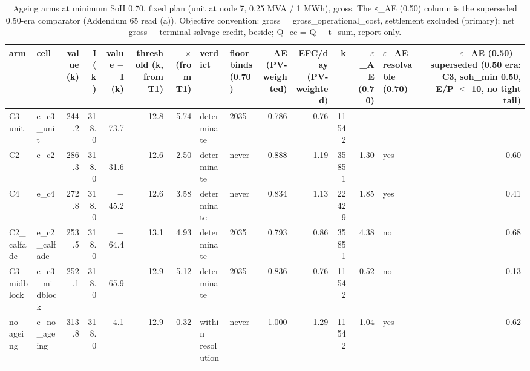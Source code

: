 \begin{table}[htbp]
\centering
\scriptsize
\caption{Ageing arms at minimum SoH 0.70, fixed plan (unit at node 7, 0.25 MVA / 1 MWh), gross. The $\varepsilon$\_AE (0.50) column is the superseded 0.50-era comparator (Addendum 65 read (a)). Objective convention: gross = gross\_operational\_cost, settlement excluded (primary); net = gross $-$ terminal salvage credit, beside; Q\_cc = Q + t\_sum, report-only.}
\label{tab:T8}
\begin{tabular}{llrrrrrllrrrrlr}
\toprule
arm & cell & value (k\texteuro{}) & I (k\texteuro{}) & value $-$ I (k\texteuro{}) & threshold (k\texteuro{}, from T1) & $\times$ (from T1) & verdict & floor binds (0.70) & AE (PV-weighted) & EFC/day (PV-weighted) & k & $\varepsilon$\_AE (0.70) & $\varepsilon$\_AE resolvable (0.70) & $\varepsilon$\_AE (0.50) -- superseded (0.50 era: C3, soh\_min 0.50, E/P $\leq$ 10, no tight tail) \\
\midrule
C3\_unit & e\_c3\_unit & 244.2 & 318.0 & $-$73.7 & 12.8 & 5.74 & determinate & 2035 & 0.786 & 0.76 & 11542 & --- & --- & --- \\
C2 & e\_c2 & 286.3 & 318.0 & $-$31.6 & 12.6 & 2.50 & determinate & never & 0.888 & 1.19 & 35851 & 1.30 & yes & 0.60 \\
C4 & e\_c4 & 272.8 & 318.0 & $-$45.2 & 12.6 & 3.58 & determinate & never & 0.834 & 1.13 & 22429 & 1.85 & yes & 0.41 \\
C2\_calfade & e\_c2\_calfade & 253.5 & 318.0 & $-$64.4 & 13.1 & 4.93 & determinate & 2035 & 0.793 & 0.86 & 35851 & 4.38 & no & 0.68 \\
C3\_midblock & e\_c3\_midblock & 252.1 & 318.0 & $-$65.9 & 12.9 & 5.12 & determinate & 2035 & 0.836 & 0.76 & 11542 & 0.52 & no & 0.13 \\
no\_ageing & e\_no\_ageing & 313.8 & 318.0 & $-$4.1 & 12.9 & 0.32 & within resolution & never & 1.000 & 1.29 & 11542 & 1.04 & yes & 0.62 \\
\bottomrule
\end{tabular}
\end{table}
